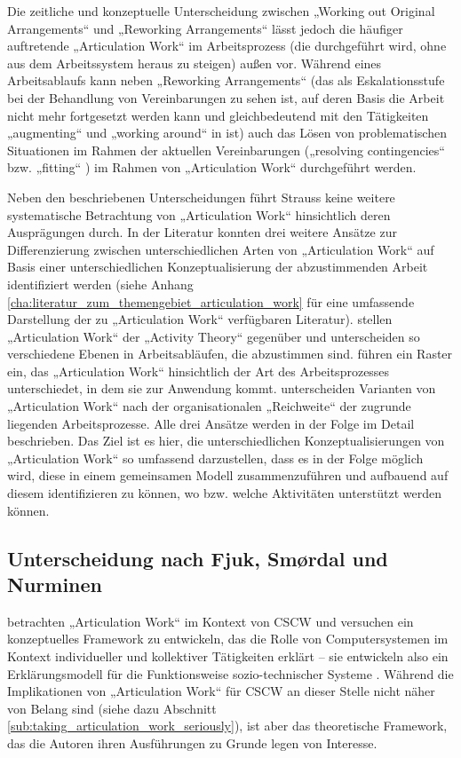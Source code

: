 Die zeitliche und konzeptuelle Unterscheidung zwischen „Working out Original Arrangements“ und „Reworking Arrangements“ lässt jedoch die häufiger auftretende „Articulation Work“ im Arbeitsprozess (die durchgeführt wird, ohne aus dem Arbeitssystem heraus zu steigen) außen vor. Während eines Arbeitsablaufs kann neben „Reworking Arrangements“ (das als Eskalationsstufe bei der Behandlung von Vereinbarungen zu sehen ist, auf deren Basis die Arbeit nicht mehr fortgesetzt werden kann und gleichbedeutend mit den Tätigkeiten „augmenting“ und „working around“ in \citep{Gasser86} ist) auch das Lösen von problematischen Situationen im Rahmen der aktuellen Vereinbarungen („resolving contingencies“ \citep{Gerson86} bzw. „fitting“ \citep{Gasser86}) im Rahmen von „Articulation Work“ durchgeführt werden.

Neben den beschriebenen Unterscheidungen führt Strauss keine weitere systematische Betrachtung von „Articulation Work“ hinsichtlich deren Ausprägungen durch. In der Literatur konnten drei weitere Ansätze zur Differenzierung zwischen unterschiedlichen Arten von „Articulation Work“ auf Basis einer unterschiedlichen Konzeptualisierung der abzustimmenden Arbeit identifiziert werden (siehe Anhang \ref{cha:literatur_zum_themengebiet_articulation_work} für eine umfassende Darstellung der zu „Articulation Work“ verfügbaren Literatur). \citet{Fjuk97} stellen „Articulation Work“ der „Activity Theory“ \citep{Leontev78} gegenüber und unterscheiden so verschiedene Ebenen in Arbeitsabläufen, die abzustimmen sind. \citet{Hampson05} führen ein Raster ein, das „Articulation Work“ hinsichtlich der Art des Arbeitsprozesses unterschiedet, in dem sie zur Anwendung kommt. \citet{Faergemann05} unterscheiden Varianten von „Articulation Work“ nach der organisationalen „Reichweite“ der zugrunde liegenden Arbeitsprozesse. Alle drei Ansätze werden in der Folge im Detail beschrieben. Das Ziel ist es hier, die unterschiedlichen Konzeptualisierungen von „Articulation Work“ so umfassend darzustellen, dass es in der Folge möglich wird, diese in einem gemeinsamen Modell zusammenzuführen und aufbauend auf diesem identifizieren zu können, wo bzw. welche Aktivitäten unterstützt werden können.

\subsection{Unterscheidung nach Fjuk, Smørdal und Nurminen}
\label{sub:arten_fjuk}

\citet{Fjuk97} betrachten „Articulation Work“ im Kontext von \gls{CSCW} und versuchen ein konzeptuelles Framework zu entwickeln, das die Rolle von Computersystemen im Kontext individueller und kollektiver Tätigkeiten erklärt -- sie entwickeln also ein Erklärungsmodell für die Funktionsweise sozio-technischer Systeme \citep{Emery60}. Während die Implikationen von „Articulation Work“ für \gls{CSCW} an dieser Stelle nicht näher von Belang sind (siehe dazu Abschnitt \ref{sub:taking_articulation_work_seriously}), ist aber das theoretische Framework, das die Autoren ihren Ausführungen zu Grunde legen von Interesse. 

